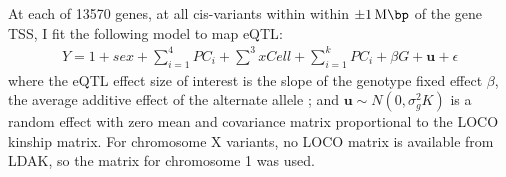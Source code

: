 At each of 13570 genes, at all cis-variants within within $\pm \SI{1}{\mega\bp}$ of the gene \gls{TSS}, I fit the following model to map \gls{eQTL}:
\begin{equation}
\begin{split}
Y = 1 + sex + \sum_{i=1}^{4}{PC_i} + \sum_{}^{3}{xCell} + \sum_{i=1}^{k}{PC_i} + \beta G + \mathbf{u} + \epsilon
\end{split}
\label{eq:hird_reQTL_limix_model}
\end{equation}
where the \gls{eQTL} effect size of interest is the slope of the genotype fixed effect $\beta$, the average additive effect of the alternate allele \autocite{visscher2019Fisher1918Paper};
and $\mathbf{u} \sim N(0, \sigma_g^2 K)$ is a random effect with zero mean and covariance matrix proportional to the \gls{LOCO} kinship matrix.
For chromosome X variants, no \gls{LOCO} matrix is available from LDAK, so the matrix for chromosome 1 was used.

